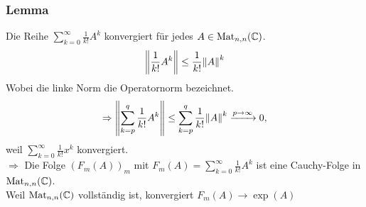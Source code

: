 \subsubsection{Lemma} %
\label{ssub:lemma}
Die Reihe $ \sum_{k=0}^{\infty}\frac{1}{k!}A^k$ konvergiert für jedes $A \in \operatorname{Mat}_{n,n}(\mathbb{C})$.
 \begin{align*}
	\norm{ \frac{1}{k!}A^k} \leq \frac{1}{k!} \norm{A}^k
\end{align*}
Wobei die linke Norm die Operatornorm bezeichnet.
\begin{align*}
	\Rightarrow \norm{ \sum_{k=p}^{q}\frac{1}{k!}A^k} \leq \sum_{k=p}^{q}\frac{1}{k!} \norm{A}^k \xrightarrow{p \to \infty} 0,
\end{align*}
weil $\sum_{k=0}^{\infty}\frac{1}{k!}x^k$ konvergiert.\\
$\Rightarrow $ Die Folge $(F_m(A))_m$ mit $F_m(A)= \sum_{k=0}^{\infty}\frac{1}{k!}A^k$ ist eine Cauchy-Folge in $\operatorname{Mat}_{n,n}(\mathbb{C})$. \\
Weil $\operatorname{Mat}_{n,n}(\mathbb{C})$ vollständig ist, konvergiert $F_m(A) \to \exp(A)$
